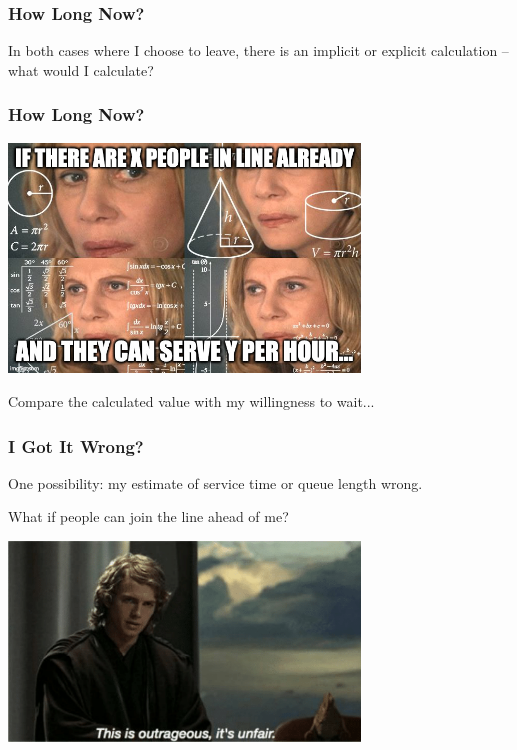 \begin{frame}
\frametitle{How Long Now?}

In both cases where I choose to leave, there is an implicit or explicit calculation -- what would I calculate?


\end{frame}


\begin{frame}
\frametitle{How Long Now?}

\begin{center}
	\includegraphics[width=0.7\textwidth]{images/calculate-wait.jpg}
\end{center}

Compare the calculated value with my willingness to wait...

\end{frame}

\begin{frame}
\frametitle{I Got It Wrong?}

One possibility: my estimate of service time or queue length wrong.

What if people can join the line ahead of me?

\begin{center}
	\includegraphics[width=0.7\textwidth]{images/unfair.png}
\end{center}


\end{frame}



